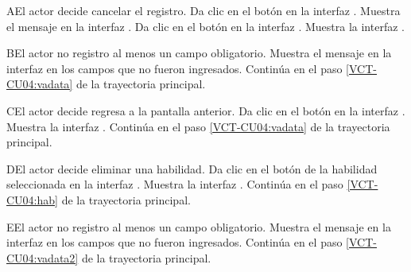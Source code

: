 \begin{UCtrayectoriaA}{A}{El actor decide cancelar el registro.}
	\UCpaso [\UCactor] Da clic en el botón  en la interfaz .
	\UCpaso [\UCsist] Muestra el mensaje  en la interfaz .
	\UCpaso [\UCactor] Da clic en el botón  en la interfaz .
	\UCpaso [\UCsist] Muestra la interfaz .
\end{UCtrayectoriaA} 

\begin{UCtrayectoriaA}{B}{El actor no registro al menos un campo obligatorio.}
	\UCpaso [\UCsist] Muestra el mensaje  en la interfaz  en los campos que no
	fueron ingresados.
	\UCpaso [\UCsist] Continúa en el paso \ref{VCT-CU04:vadata} de la trayectoria principal.
\end{UCtrayectoriaA} 

\begin{UCtrayectoriaA}{C}{El actor decide regresa a la pantalla anterior.}
	\UCpaso [\UCactor] Da clic en el botón  en la interfaz .
	\UCpaso [\UCsist] Muestra la interfaz .
	\UCpaso [\UCsist] Continúa en el paso \ref{VCT-CU04:vadata} de la trayectoria principal.
\end{UCtrayectoriaA} 

\begin{UCtrayectoriaA}{D}{El actor decide eliminar una habilidad.}
	\UCpaso [\UCactor] Da clic en el botón  de la habilidad seleccionada en la interfaz .
	\UCpaso [\UCsist] Muestra la interfaz .
	\UCpaso [\UCsist] Continúa en el paso \ref{VCT-CU04:hab} de la trayectoria principal.
\end{UCtrayectoriaA} 

\begin{UCtrayectoriaA}{E}{El actor no registro al menos un campo obligatorio.}
	\UCpaso [\UCsist] Muestra el mensaje  en la interfaz  en los campos que no
	fueron ingresados.
	\UCpaso [\UCsist] Continúa en el paso \ref{VCT-CU04:vadata2} de la trayectoria principal.
\end{UCtrayectoriaA} 

